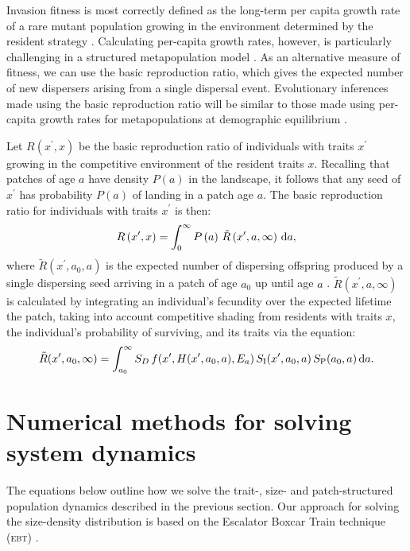 \documentclass[10pt,twoside]{article}
\begin{document}
Invasion fitness is most correctly defined as the long-term per capita
growth rate of a rare mutant population growing in the environment
determined by the resident strategy \citep{Metz-1992}. Calculating
per-capita growth rates, however, is particularly challenging in a
structured metapopulation model \citep{Gyllenberg-2001, Metz-2001}. As
an alternative measure of fitness, we can use the basic reproduction
ratio, which gives the expected number of new dispersers arising from a
single dispersal event. Evolutionary inferences made using the basic
reproduction ratio will be similar to those made using per-capita growth
rates for metapopulations at demographic equilibrium
\citep{Gyllenberg-2001, Metz-2001}.

Let \(R\left(x^\prime, x\right)\) be the basic reproduction ratio of
individuals with traits \(x^\prime\) growing in the competitive
environment of the resident traits \(x\). Recalling that patches of age
\(a\) have density \(P(a)\) in the landscape, it follows that any seed
of \(x^\prime\) has probability \(P(a)\) of landing in a patch age
\(a\). The basic reproduction ratio for individuals with traits
\(x^\prime\) is then:
\begin{equation} \label{eq:InvFit}
  R\left(x^\prime,x\right) = \int _0^{\infty} P\left(a\right) \, \tilde{R}\left(x^\prime, a, \infty \right) \, {\rm d}a ,
\end{equation}
where \(\tilde{R}\left(x^\prime, a_0, a \right)\) is the expected number
of dispersing offspring produced by a single dispersing seed arriving in
a patch of age \(a_0\) up until age \(a\)
\citep{Gyllenberg-2001, Metz-2001}.
\(\tilde{R}\left(x^\prime, a,\infty\right)\) is calculated by integrating
an individual's fecundity over the expected lifetime the patch, taking
into account competitive shading from residents with traits \(x\), the
individual's probability of surviving, and its traits via the equation:
\begin{equation} \label{eq:tildeR}
  \tilde{R}(x^\prime, a_0, \infty) = \int_{a_0}^{\infty}  S_D \, f(x^\prime, H(x^\prime, a_0, a), E_{a}) \, S_{\rm I} (x^\prime, a_0, a) \, S_{\rm P} (a_0, a) \, {\rm d} a.
\end{equation}

\section{Numerical methods for solving system dynamics}

The equations below outline how we solve the trait-, size- and patch-structured
population dynamics described in the previous section.
Our approach for solving the size-density distribution  is
based on the Escalator Boxcar Train technique (\textsc{ebt})
\citep{Deroos-1997, Deroos-1992, Deroos-1988}.
\end{document}
